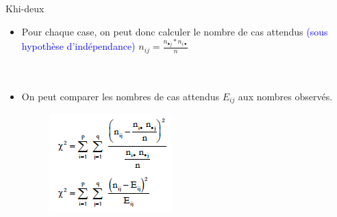 \documentclass[10pt]{beamer}
\begin{document}
\begin{frame}{  Khi-deux}
\begin{itemize}
\item Pour chaque case, on peut donc calculer le nombre de cas attendus \textcolor{blue}{(sous hypothèse d’indépendance)}
$n_{ij}=\frac{n_{\bullet j}*n_{i \bullet}}{n} $\\~\\~\\

\item On peut comparer les nombres de cas attendus $E_{ij}$ aux nombres observés.

\begin{figure}
\includegraphics[scale=0.8]{Exemple6.png}  
\end{figure}
\end{itemize}
\end{frame}
\end{document}

